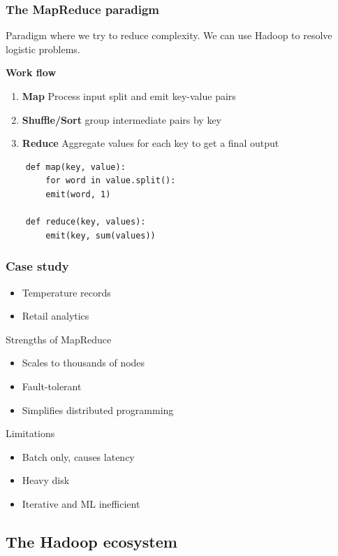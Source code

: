 \subsubsection{The MapReduce paradigm}

Paradigm where we try to reduce complexity. We can use Hadoop to resolve logistic problems. 

\textbf{Work flow} 

\begin{enumerate}
    \item \textbf{Map} \ra Process input split and emit key-value pairs
    \item \textbf{Shuffle/Sort} \ra group intermediate pairs by key
    \item \textbf{Reduce } \ra Aggregate values for each key to get a final output
\end{enumerate}

\begin{verbatim}
    def map(key, value):
        for word in value.split():
        emit(word, 1)

    def reduce(key, values):
        emit(key, sum(values))
\end{verbatim}

\subsubsection{Case study}

\begin{itemize}
    \item Temperature records
    \item Retail analytics
\end{itemize}

Strengths of MapReduce
\begin{itemize}
    \item Scales to thousands of nodes
    \item Fault-tolerant
    \item Simplifies distributed programming
\end{itemize}

Limitations
\begin{itemize}
    \item Batch only, causes latency
    \item Heavy disk
    \item Iterative and ML inefficient
\end{itemize}

\subsection{The Hadoop ecosystem}

